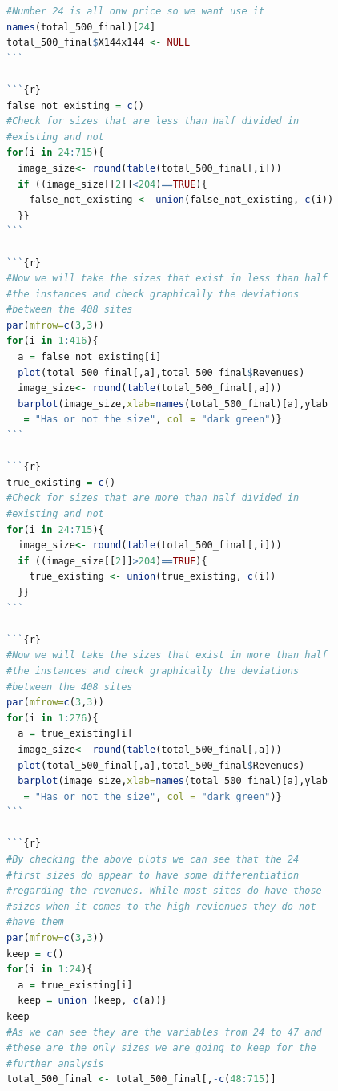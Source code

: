 \documentclass{book}
\begin{document}
\begin{lstlisting}[language=R]
#Number 24 is all onw price so we want use it
names(total_500_final)[24]
total_500_final$X144x144 <- NULL
```

```{r}
false_not_existing = c()
#Check for sizes that are less than half divided in 
#existing and not
for(i in 24:715){
  image_size<- round(table(total_500_final[,i]))
  if ((image_size[[2]]<204)==TRUE){
    false_not_existing <- union(false_not_existing, c(i))
  }}
```

```{r}
#Now we will take the sizes that exist in less than half 
#the instances and check graphically the deviations 
#between the 408 sites
par(mfrow=c(3,3))
for(i in 1:416){
  a = false_not_existing[i]
  plot(total_500_final[,a],total_500_final$Revenues)
  image_size<- round(table(total_500_final[,a]))
  barplot(image_size,xlab=names(total_500_final)[a],ylab
   = "Has or not the size", col = "dark green")}
```

```{r}
true_existing = c()
#Check for sizes that are more than half divided in 
#existing and not
for(i in 24:715){
  image_size<- round(table(total_500_final[,i]))
  if ((image_size[[2]]>204)==TRUE){
    true_existing <- union(true_existing, c(i))
  }}
```

```{r}
#Now we will take the sizes that exist in more than half 
#the instances and check graphically the deviations 
#between the 408 sites
par(mfrow=c(3,3))
for(i in 1:276){
  a = true_existing[i]
  image_size<- round(table(total_500_final[,a]))
  plot(total_500_final[,a],total_500_final$Revenues)
  barplot(image_size,xlab=names(total_500_final)[a],ylab
   = "Has or not the size", col = "dark green")}
```

```{r}
#By checking the above plots we can see that the 24 
#first sizes do appear to have some differentiation 
#regarding the revenues. While most sites do have those 
#sizes when it comes to the high revienues they do not 
#have them
par(mfrow=c(3,3))
keep = c()
for(i in 1:24){
  a = true_existing[i]
  keep = union (keep, c(a))}
keep
#As we can see they are the variables from 24 to 47 and 
#these are the only sizes we are going to keep for the 
#further analysis
total_500_final <- total_500_final[,-c(48:715)]
\end{lstlisting} 
\end{document}
